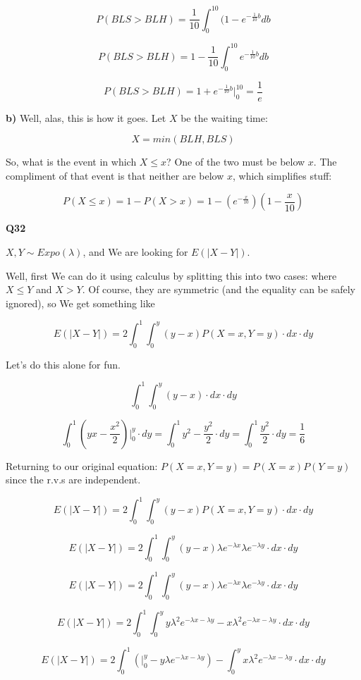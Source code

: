 \documentclass{article}
\begin{document}
			\[ P(BLS>BLH) = \frac{1}{10}\int_0^{10} (1-e^{-\frac{1}{10}b} db \]
			
			\[ P(BLS>BLH) = 1 - \frac{1}{10}\int_0^{10} e^{-\frac{1}{10}b} db \]
			
			\[ P(BLS>BLH) = 1 + e^{-\frac{1}{10}b}\bigg|^{10}_0 = \frac{1}{e} \]
			
			\textbf{b)} Well, alas, this is how it goes. Let $X$ be the waiting time:
			
			\[X = min(BLH, BLS)\]

			So, what is the event in which $X\le x$? One of the two must be below $x$. The compliment of that event is that neither are below $x$, which simplifies stuff:
			
			\[ P(X\le x) = 1-P(X>x) = 1-(e^{-\frac{x}{10}})(1-\frac{x}{10}) \]

			\hfill
			
		\textbf{Q32}
		
			$X, Y\sim Expo(\lambda)$, and We are looking for $E(|X-Y|)$.
			
			Well, first We can do it using calculus by splitting this into two cases: where $X\le Y$ and $X > Y$. Of course, they are symmetric (and the equality can be safely ignored), so We get something like
						
			\[ E(|X-Y|) = 2\int^1_0 \int^y_0 (y-x)P(X=x, Y=y) \cdot dx \cdot dy \]
			
			Let's do this alone for fun. 
			
			\[\int^1_0 \int^y_0 (y-x) \cdot dx \cdot dy \]
			
			\[\int^1_0  \left(yx - \frac{x^2}{2}\right)\bigg|^y_0 \cdot dy = \int^1_0 y^2 - \frac{y^2}{2}\cdot dy = \int^1_0 \frac{y^2}{2}\cdot dy = \frac{1}{6} \]
			
			Returning to our original equation: $P(X=x, Y=y) = P(X=x)P(Y=y)$ since the r.v.s are independent.
						
			\[ E(|X-Y|) = 2\int^1_0 \int^y_0 (y-x)P(X=x, Y=y) \cdot dx \cdot dy \]
						
			\[ E(|X-Y|) = 2\int^1_0 \int^y_0 (y-x) \lambda e^{-\lambda x}\lambda e^{-\lambda y} \cdot dx \cdot dy \]
						
			\[ E(|X-Y|) = 2\int^1_0 \int^y_0 (y-x) \lambda e^{-\lambda x}\lambda e^{-\lambda y} \cdot dx \cdot dy \]
						
			\[ E(|X-Y|) = 2\int^1_0 \int^y_0 y\lambda^2e^{-\lambda x - \lambda y} - x\lambda^2e^{-\lambda x - \lambda y} \cdot dx \cdot dy \]
						
			\[ E(|X-Y|) = 2\int^1_0 \left(\bigg|^y_0 -y\lambda e^{-\lambda x - \lambda y}\right) - \int^y_0 x\lambda^2 e^{-\lambda x - \lambda y} \cdot dx \cdot dy \]
							
\end{document}
